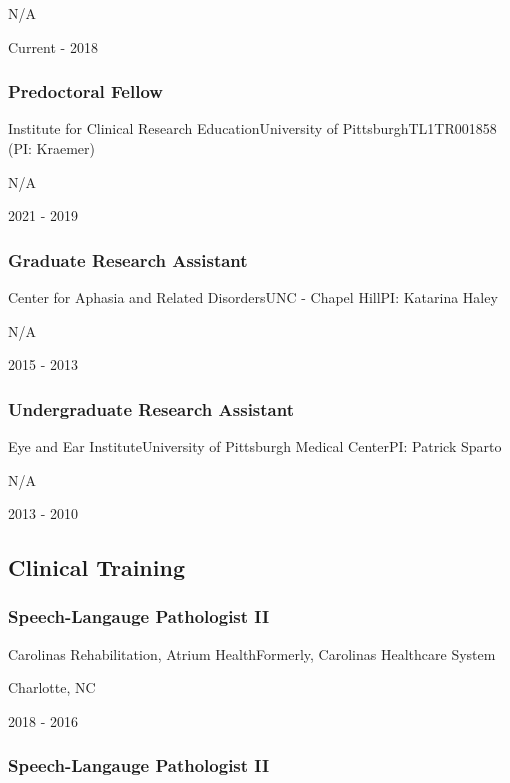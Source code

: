 \documentclass[
]{article}
\begin{document}
N/A

Current - 2018

\hypertarget{predoctoral-fellow}{%
\subsubsection{Predoctoral Fellow}\label{predoctoral-fellow}}

Institute for Clinical Research EducationUniversity of
PittsburghTL1TR001858 (PI: Kraemer)

N/A

2021 - 2019

\hypertarget{graduate-research-assistant}{%
\subsubsection{Graduate Research
Assistant}\label{graduate-research-assistant}}

Center for Aphasia and Related DisordersUNC - Chapel HillPI: Katarina
Haley

N/A

2015 - 2013

\hypertarget{undergraduate-research-assistant}{%
\subsubsection{Undergraduate Research
Assistant}\label{undergraduate-research-assistant}}

Eye and Ear InstituteUniversity of Pittsburgh Medical CenterPI: Patrick
Sparto

N/A

2013 - 2010

\hypertarget{clinical-training}{%
\subsection{Clinical Training}\label{clinical-training}}

\hypertarget{speech-langauge-pathologist-ii}{%
\subsubsection{Speech-Langauge Pathologist
II}\label{speech-langauge-pathologist-ii}}

Carolinas Rehabilitation, Atrium HealthFormerly, Carolinas Healthcare
System

Charlotte, NC

2018 - 2016

\hypertarget{speech-langauge-pathologist-ii-1}{%
\subsubsection{Speech-Langauge Pathologist
II}\label{speech-langauge-pathologist-ii-1}}
\end{document}
